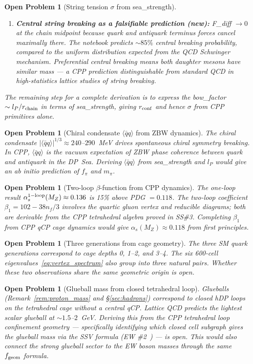 \documentclass[11pt,a4paper]{article}
\newtheorem{openprob}[theorem]{Open Problem}
\newcommand{\lP}{l_P}
\newcommand{\as}{\alpha_s}
\newcommand{\qqbar}{\langle\bar{q}q\rangle}
\begin{document}
\begin{openprob}[String tension $\sigma$ from sea\_strength]
\begin{enumerate}
\item \textbf{Central string breaking as a falsifiable prediction
  (new):}
  F\_diff $\to 0$ at the chain midpoint because quark and antiquark
  terminus forces cancel maximally there.  The notebook predicts
  $\sim 85\%$ central breaking probability, compared to the uniform
  distribution expected from the QCD Schwinger mechanism.
  Preferential central breaking means both daughter mesons have
  similar mass --- a CPP prediction distinguishable from standard
  QCD in high-statistics lattice studies of string breaking.
\end{enumerate}

The remaining step for a complete derivation is to express the
bow\_factor $\sim \lP/r_{\rm chain}$ in terms of sea\_strength,
giving $r_{\rm conf}$ and hence $\sigma$ from CPP primitives alone.
\end{openprob}

\begin{openprob}[Chiral condensate $\qqbar$ from ZBW dynamics]
\label{op:qqbar}
The chiral condensate $|\qqbar|^{1/3} \approx 240$--$290$~MeV
drives spontaneous chiral symmetry breaking.  In CPP, $\qqbar$ is
the vacuum expectation of ZBW phase coherence between quark and
antiquark in the DP~Sea.  Deriving $\qqbar$ from sea\_strength
and $\lP$ would give an ab initio prediction of $f_\pi$ and $m_\pi$.
\end{openprob}

\begin{openprob}[Two-loop $\beta$-function from CPP dynamics]
\label{op:alphas}
The one-loop result $\as^{\rm 1-loop}(M_Z) \approx 0.136$ is 15\%
above PDG $= 0.118$.  The two-loop coefficient $\beta_1 = 102 -
38n_f/3$ involves the quartic gluon vertex and reducible diagrams;
both are derivable from the CPP tetrahedral algebra proved in SS\#3.
Completing $\beta_1$ from CPP qCP cage dynamics would give
$\as(M_Z) \approx 0.118$ from first principles.
\end{openprob}

\begin{openprob}[Three generations from cage geometry]
\label{op:generations}
The three SM quark generations correspond to cage depths 0, 1--2,
and 3--4.  The six 600-cell eigenvalues~\eqref{eq:vertex_spectrum}
also group into three natural pairs.  Whether these two observations
share the same geometric origin is open.
\end{openprob}

\begin{openprob}[Glueball mass from closed tetrahedral loop]
\label{op:glueball}
Glueballs (Remark~\ref{rem:proton_mass} and \S\ref{sec:hadrons})
correspond to closed hDP loops on the tetrahedral cage without a
central qCP.  Lattice QCD predicts the lightest scalar glueball at
$\sim1.5$--$2$~GeV.  Deriving this from the CPP tetrahedral loop
confinement geometry --- specifically identifying which closed cell
subgraph gives the glueball mass via the SSV formula (EW
\#2~\citep{cpp_ew2}) --- is open.  This would also connect the
strong glueball sector to the EW boson masses through the same
$f_{\rm geom}$ formula.
\end{openprob}
\end{document}
